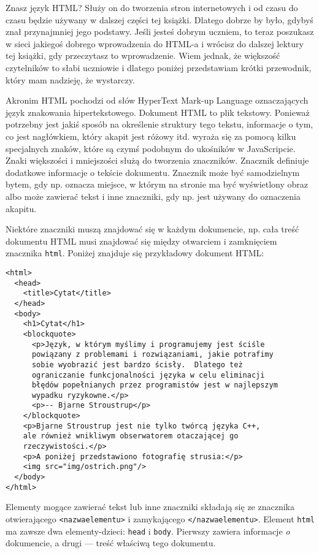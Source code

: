   
Znasz język HTML? Służy on do tworzenia stron internetowych i od czasu do czasu będzie używany w dalszej części tej książki. Dlatego dobrze by było, gdybyś znał przynajmniej jego podstawy. Jeśli jesteś dobrym uczniem, to teraz poszukasz w sieci jakiegoś dobrego wprowadzenia do HTML-a i wrócisz do dalszej lektury tej książki, gdy przeczytasz to wprowadzenie. Wiem jednak, że większość czytelników to słabi uczniowie i dlatego poniżej przedstawiam krótki przewodnik, który mam nadzieję, że wystarczy.

  
Akronim HTML pochodzi od słów HyperText Mark-up Language oznaczających język znakowania hipertekstowego. Dokument HTML to plik tekstowy. Ponieważ potrzebny jest jakiś sposób na określenie struktury tego tekstu, informacje o tym, co jest nagłówkiem, który akapit jest różowy itd. wyraża się za pomocą kilku specjalnych znaków, które są czymś podobnym do ukośników w JavaScripcie. Znaki większości i mniejszości służą do tworzenia znaczników. Znacznik definiuje dodatkowe informacje o tekście dokumentu. Znacznik może być samodzielnym bytem, gdy np. oznacza miejsce, w którym na stronie ma być wyświetlony obraz albo może zawierać tekst i inne znaczniki, gdy np. jest używany do oznaczenia akapitu.

  
Niektóre znaczniki muszą znajdować się w każdym dokumencie, np. cała treść dokumentu HTML musi znajdować się między otwarciem i zamknięciem znacznika \texttt{html}. Poniżej znajduje się przykładowy dokument HTML:

  
\begin{verbatim} 
<html>
  <head>
    <title>Cytat</title>
  </head>
  <body>
    <h1>Cytat</h1>
    <blockquote>
      <p>Język, w którym myślimy i programujemy jest ściśle
      powiązany z problemami i rozwiązaniami, jakie potrafimy
      sobie wyobrazić jest bardzo ścisły.  Dlatego też
      ograniczanie funkcjonalności języka w celu eliminacji
      błędów popełnianych przez programistów jest w najlepszym
      wypadku ryzykowne.</p>
      <p>-- Bjarne Stroustrup</p>
    </blockquote>
    <p>Bjarne Stroustrup jest nie tylko twórcą języka C++,
    ale również wnikliwym obserwatorem otaczającej go
    rzeczywistości.</p>
    <p>A poniżej przedstawiono fotografię strusia:</p>
    <img src="img/ostrich.png"/>
  </body>
</html>
 \end{verbatim}
  
Elementy mogące zawierać tekst lub inne znaczniki składają się ze znacznika otwierającego \texttt{<nazwaelementu>} i zamykającego \texttt{</nazwaelementu>}. Element \texttt{html} ma zawsze dwa elementy-dzieci: \texttt{head} i \texttt{body}. Pierwszy zawiera informacje \emph{o} dokumencie, a drugi — treść właściwą tego dokumentu.

